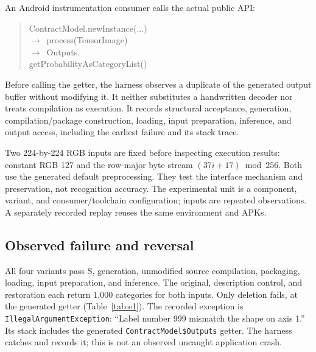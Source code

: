 \documentclass[10pt,twocolumn,letterpaper]{article}
\newcommand{\code}[1]{\texttt{#1}}
\begin{document}
An Android instrumentation consumer calls the actual public API:
\begin{quote}\small\ttfamily\raggedright
ContractModel.newInstance(...)\\
\quad\(\rightarrow\)\ process(TensorImage)\\
\quad\(\rightarrow\)\ Outputs.\\
\hspace*{1.4em}getProbabilityAsCategoryList()
\end{quote}
Before calling the getter, the harness observes a duplicate of the generated output buffer without modifying it. It neither substitutes a handwritten decoder nor treats compilation as execution. It records structural acceptance, generation, compilation/package construction, loading, input preparation, inference, and output access, including the earliest failure and its stack trace.

Two 224-by-224 RGB inputs are fixed before inspecting execution results: constant RGB 127 and the row-major byte stream $(37i+17)\bmod256$. Both use the generated default preprocessing. They test the interface mechanism and preservation, not recognition accuracy. The experimental unit is a component, variant, and consumer/toolchain configuration; inputs are repeated observations. A separately recorded replay reuses the same environment and APKs.

\subsection{Observed failure and reversal}
All four variants pass S, generation, unmodified source compilation, packaging, loading, input preparation, and inference. The original, description control, and restoration each return 1,000 categories for both inputs. Only deletion fails, at the generated getter (Table~\ref{tab:e1}). The recorded exception is \code{IllegalArgumentException}: ``Label number 999 mismatch the shape on axis 1.'' Its stack includes the generated \code{ContractModel\$Outputs} getter. The harness catches and records it; this is not an observed uncaught application crash.
\end{document}
